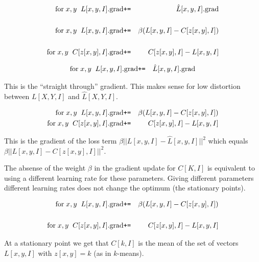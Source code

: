 {\begin{eqnarray*}
\mathrm{for}\;x,y\;\;L[x,y,I].\mathrm{grad} & \mbox{\tt +=} & \hat{L}[x,y,I].\mathrm{grad} \\
\\
\mathrm{for}\;x,y\;\;L[x,y,I].\mathrm{grad} & \mbox{\tt +=} & \beta({L}[x,y,I]- C[z[x,y],I]) \\
\\
\mathrm{for}\;x,y\;\;C[z[x,y],I].\mathrm{grad} & \mbox{\tt +=} & C[z[x,y],I] - L[x,y,I]
\end{eqnarray*}


\begin{eqnarray*}
\mathrm{for}\;x,y\;\;L[x,y,I].\mathrm{grad} & \mbox{\tt +=} & \hat{L}[x,y,I].\mathrm{grad}
\end{eqnarray*}

\vfill
This is the ``straight through'' gradient.  This makes sense for low distortion between $L[X,Y,I]$ and $\hat{L}[X,Y,I]$.


\begin{eqnarray*}
\mathrm{for}\;x,y\;\;L[x,y,I].\mathrm{grad} & \mbox{\tt +=} & \beta({L}[x,y,I]- C[z[x,y],I]) \\
\mathrm{for}\;x,y\;\;C[z[x,y],I].\mathrm{grad} & \mbox{\tt +=} & C[z[x,y],I] - L[x,y,I]
\end{eqnarray*}

\vfill
This is the gradient of the loss term $\beta||L[x,y,I] - \hat{L}[x,y,I]||^2$ which equals $\beta||L[x,y,I] - C[z[x,y],I]||^2$.

\vfill
The absense of the weight $\beta$ in the gradient update for $C[K,I]$ is equivalent to using a different learning rate for these parameters.
Giving different parameters different learning rates does not change the optimum (the stationary points).


\begin{eqnarray*}
\mathrm{for}\;x,y\;\;L[x,y,I].\mathrm{grad} & \mbox{\tt +=} & \beta({L}[x,y,I]- C[z[x,y],I]) \\
\\
\mathrm{for}\;x,y\;\;C[z[x,y],I].\mathrm{grad} & \mbox{\tt +=} & C[z[x,y],I] - L[x,y,I]
\end{eqnarray*}

\vfill
At a stationary point we get that $C[k,I]$ is the mean of the set of vectors $L[x,y,I]$ with $z[x,y] = k$ (as in $k$-means).


}
